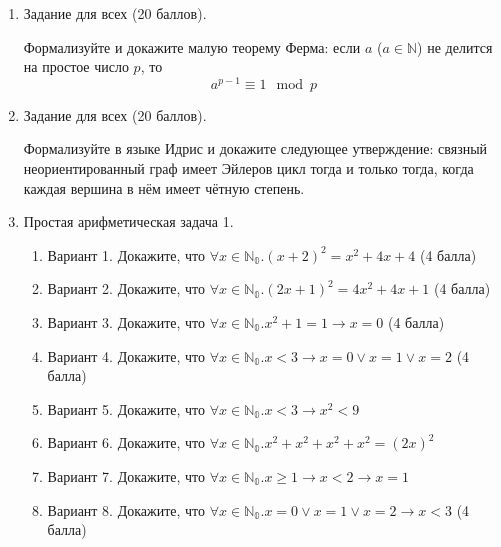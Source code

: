 \documentclass[10pt,a4paper,oneside]{article}
\begin{document}
\begin{enumerate}
\item Задание для всех (20 баллов).

Формализуйте и докажите малую теорему Ферма: если $a$ ($a \in \mathbb{N}$) не делится на простое число $p$,
то $$a^{p-1} \equiv 1 \mod p$$

\item Задание для всех (20 баллов).

Формализуйте в языке Идрис и докажите следующее утверждение: связный неориентированный
граф имеет Эйлеров цикл тогда и только тогда, когда каждая вершина в нём имеет чётную степень.

\item Простая арифметическая задача 1.
\begin{enumerate}
\item Вариант 1.
Докажите, что $\forall x\in\mathbb{N_0}.(x+2)^2 = x^2 + 4x + 4$ (4 балла)
\item Вариант 2.
Докажите, что $\forall x\in\mathbb{N_0}.(2x+1)^2 = 4x^2 + 4x + 1$ (4 балла)
\item Вариант 3.
Докажите, что $\forall x\in\mathbb{N_0}.x^2 + 1 = 1 \rightarrow x = 0$ (4 балла)
\item Вариант 4.
Докажите, что $\forall x\in\mathbb{N_0}.x < 3 \rightarrow x = 0 \vee x = 1 \vee x = 2$ (4 балла)
\item Вариант 5.
Докажите, что $\forall x\in\mathbb{N_0}.x < 3 \rightarrow x^2 < 9$
\item Вариант 6.
Докажите, что $\forall x\in\mathbb{N_0}.x^2 + x^2 + x^2 + x^2 = (2x)^2$
\item Вариант 7.
Докажите, что $\forall x\in\mathbb{N_0}.x \ge 1 \rightarrow x < 2 \rightarrow x = 1$
\item Вариант 8.
Докажите, что $\forall x\in\mathbb{N_0}.x = 0 \vee x = 1 \vee x = 2 \rightarrow x < 3$ (4 балла)
\end{enumerate}

\end{enumerate}
\end{document}
